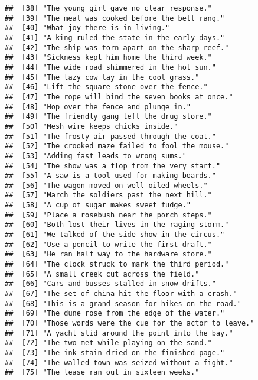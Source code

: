 \documentclass[
]{article}
\begin{document}
\begin{verbatim}
##  [38] "The young girl gave no clear response."                   
##  [39] "The meal was cooked before the bell rang."                
##  [40] "What joy there is in living."                             
##  [41] "A king ruled the state in the early days."                
##  [42] "The ship was torn apart on the sharp reef."               
##  [43] "Sickness kept him home the third week."                   
##  [44] "The wide road shimmered in the hot sun."                  
##  [45] "The lazy cow lay in the cool grass."                      
##  [46] "Lift the square stone over the fence."                    
##  [47] "The rope will bind the seven books at once."              
##  [48] "Hop over the fence and plunge in."                        
##  [49] "The friendly gang left the drug store."                   
##  [50] "Mesh wire keeps chicks inside."                           
##  [51] "The frosty air passed through the coat."                  
##  [52] "The crooked maze failed to fool the mouse."               
##  [53] "Adding fast leads to wrong sums."                         
##  [54] "The show was a flop from the very start."                 
##  [55] "A saw is a tool used for making boards."                  
##  [56] "The wagon moved on well oiled wheels."                    
##  [57] "March the soldiers past the next hill."                   
##  [58] "A cup of sugar makes sweet fudge."                        
##  [59] "Place a rosebush near the porch steps."                   
##  [60] "Both lost their lives in the raging storm."               
##  [61] "We talked of the side show in the circus."                
##  [62] "Use a pencil to write the first draft."                   
##  [63] "He ran half way to the hardware store."                   
##  [64] "The clock struck to mark the third period."               
##  [65] "A small creek cut across the field."                      
##  [66] "Cars and busses stalled in snow drifts."                  
##  [67] "The set of china hit the floor with a crash."             
##  [68] "This is a grand season for hikes on the road."            
##  [69] "The dune rose from the edge of the water."                
##  [70] "Those words were the cue for the actor to leave."         
##  [71] "A yacht slid around the point into the bay."              
##  [72] "The two met while playing on the sand."                   
##  [73] "The ink stain dried on the finished page."                
##  [74] "The walled town was seized without a fight."              
##  [75] "The lease ran out in sixteen weeks."                      

\end{verbatim}
\end{document}
